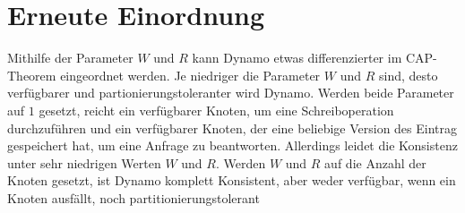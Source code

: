 \section{Erneute Einordnung}
Mithilfe der Parameter $W$ und $R$ kann Dynamo etwas differenzierter im CAP-Theorem eingeordnet werden. Je niedriger die Parameter $W$ und $R$ sind, desto verfügbarer und partionierungstoleranter wird Dynamo. Werden beide Parameter auf $1$ gesetzt, reicht ein verfügbarer Knoten, um eine Schreiboperation durchzuführen und ein verfügbarer Knoten, der eine beliebige Version des Eintrag gespeichert hat, um eine Anfrage zu beantworten. Allerdings leidet die Konsistenz unter sehr niedrigen Werten $W$ und $R$. Werden $W$ und $R$ auf die Anzahl der Knoten gesetzt, ist Dynamo komplett Konsistent, aber weder verfügbar, wenn ein Knoten ausfällt, noch partitionierungstolerant